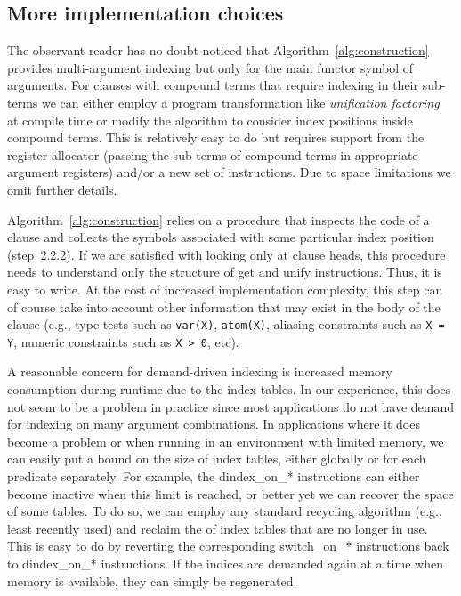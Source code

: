\documentclass{llncs}
\newcommand{\code}[1]{\texttt{#1}}
\newcommand{\instr}[1]{\textsf{#1}}
\newcommand{\jitiSTAR}{\mbox{\instr{dindex\_on\_*}}\xspace}
\newcommand{\switchSTAR}{\mbox{\instr{switch\_on\_*}}\xspace}
\newcommand{\JITI}{demand-driven indexing\xspace}
\begin{document}
\subsection{More implementation choices}
The observant reader has no doubt noticed that
Algorithm~\ref{alg:construction} provides multi-argument indexing but
only for the main functor symbol of arguments. For clauses with
compound terms that require indexing in their sub-terms we can either
employ a program transformation like \emph{unification
factoring}~\cite{UnifFact@POPL-95} at compile time or modify the
algorithm to consider index positions inside compound terms. This is
relatively easy to do but requires support from the register allocator
(passing the sub-terms of compound terms in appropriate argument
registers) and/or a new set of instructions. Due to space limitations
we omit further details.

Algorithm~\ref{alg:construction} relies on a procedure that inspects
the code of a clause and collects the symbols associated with some
particular index position (step~2.2.2). If we are satisfied with
looking only at clause heads, this procedure needs to understand only
the structure of \instr{get} and \instr{unify} instructions. Thus, it
is easy to write. At the cost of increased implementation complexity,
this step can of course take into account other information that may
exist in the body of the clause (e.g., type tests such as
\code{var(X)}, \code{atom(X)}, aliasing constraints such as \code{X =
Y}, numeric constraints such as \code{X > 0}, etc).

A reasonable concern for \JITI is increased memory consumption during
runtime due to the index tables. In our experience, this does not seem
to be a problem in practice since most applications do not have demand
for indexing on many argument combinations. In applications where it
does become a problem or when running in an environment with limited
memory, we can easily put a bound on the size of index tables, either
globally or for each predicate separately. For example, the \jitiSTAR
instructions can either become inactive when this limit is reached, or
better yet we can recover the space of some tables. To do so, we can
employ any standard recycling algorithm (e.g., least recently used)
and reclaim the of index tables that are no longer in use. This is
easy to do by reverting the corresponding \switchSTAR instructions
back to \jitiSTAR instructions. If the indices are demanded again at a
time when memory is available, they can simply be regenerated.
\end{document}
